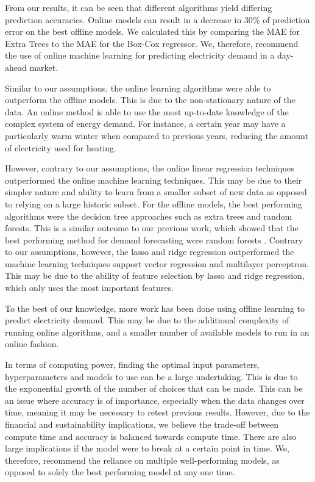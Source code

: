 
From our results, it can be seen that different algorithms yield differing prediction accuracies. Online models can result in a decrease in 30\% of prediction error on the best offline models. We calculated this by comparing the MAE for Extra Trees to the MAE for the Box-Cox regressor. We, therefore, recommend the use of online machine learning for predicting electricity demand in a day-ahead market.

Similar to our assumptions, the online learning algorithms were able to outperform the offline models. This is due to the non-stationary nature of the data. An online method is able to use the most up-to-date knowledge of the complex system of energy demand. For instance, a certain year may have a particularly warm winter when compared to previous years, reducing the amount of electricity used for heating.

However, contrary to our assumptions, the online linear regression techniques outperformed the online machine learning techniques. This may be due to their simpler nature and ability to learn from a smaller subset of new data as opposed to relying on a large historic subset. For the offline models, the best performing algorithms were the decision tree approaches such as extra trees and random forests. This is a similar outcome to our previous work, which showed that the best performing method for demand forecasting were random forests \cite{Kell2018}. Contrary to our assumptions, however, the lasso and ridge regression outperformed the machine learning techniques support vector regression and multilayer perceptron. This may be due to the ability of feature selection by lasso and ridge regression, which only uses the most important features.

To the best of our knowledge, more work has been done using offline learning to predict electricity demand. This may be due to the additional complexity of running online algorithms, and a smaller number of available models to run in an online fashion.

In terms of computing power, finding the optimal input parameters, hyperparameters and models to use can be a large undertaking. This is due to the exponential growth of the number of choices that can be made. This can be an issue where accuracy is of importance, especially when the data changes over time, meaning it may be necessary to retest previous results. However, due to the financial and sustainability implications, we believe the trade-off between compute time and accuracy is balanced towards compute time. There are also large implications if the model were to break at a certain point in time. We, therefore, recommend the reliance on multiple well-performing models, as opposed to solely the best performing model at any one time. 

